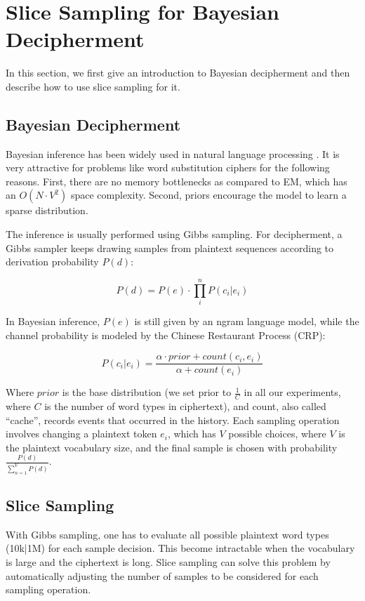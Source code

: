\section{Slice Sampling for Bayesian Decipherment}
In this section, we first give an introduction to Bayesian decipherment and then describe how to use slice sampling for it.

\subsection{Bayesian Decipherment}
Bayesian inference has been widely used in natural language processing \cite{goldwater-griffiths:2007:ACLMain,Blunsom:2009,ravi-knight:2011}. It is very attractive for problems like word substitution ciphers for the following reasons. First, there are no memory bottlenecks as compared to EM, which has an $O(N\cdot V^2)$ space complexity. Second, priors encourage the model to learn a sparse distribution.

The inference is usually performed using Gibbs sampling. For decipherment, a Gibbs sampler keeps drawing samples from plaintext sequences according to derivation probability $P(d)$:
 
\begin{equation}
\label{p_d}
P(d) =   P(e) \cdot \prod_{i}^{n}  P(c_{i}|e_{i})
\end{equation} 

In Bayesian inference, $P(e)$ is still given by an ngram language model, while the channel probability is modeled by the Chinese Restaurant Process (CRP):

\begin{equation}
P(c_{i}|e_{i})=\frac{\alpha \cdot prior+count(c_{i},e_{i})}{\alpha+count(e_{i})}
\end{equation}

Where $prior$ is the base distribution (we set prior to $\frac{1}{C}$ in all our experiments, where $C$ is the number of word types in ciphertext), and count, also called ``cache'', records events that occurred in the history. Each sampling operation involves changing a plaintext token $e_{i}$, which has $V$ possible choices, where $V$ is the plaintext vocabulary size, and the final sample is chosen with probability $\frac{P(d)}{\sum_{n=1}^{V}P(d)}$.

\subsection{Slice Sampling}
With Gibbs sampling, one has to evaluate all possible plaintext word types (10k|1M) for each sample decision. This become intractable when the vocabulary is large and the ciphertext is long. Slice sampling \cite{Neal00slicesampling} can solve this problem by automatically adjusting the number of samples to be considered for each sampling operation.


